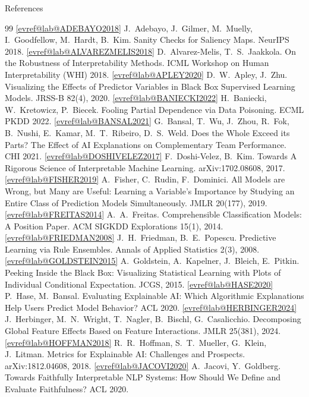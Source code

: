\documentclass[10pt,compress,t,notes=noshow,xcolor=table]{beamer}
\makeatletter
\newcommand{\citeref}[1]{%
  \href{\csname evref@url@#1\endcsname}{[\csname evref@lab@#1\endcsname]}}
\makeatother
\begin{document}
{
\begin{frame}[allowframebreaks]{References}
\tiny
\begin{thebibliography}{99}\setlength{\itemsep}{0.25em}
 \citeref{ADEBAYO2018} J.~Adebayo, J.~Gilmer, M.~Muelly, I.~Goodfellow, M.~Hardt, B.~Kim. Sanity Checks for Saliency Maps. NeurIPS 2018.
 \citeref{ALVAREZMELIS2018} D.~Alvarez-Melis, T.~S.~Jaakkola. On the Robustness of Interpretability Methods. ICML Workshop on Human Interpretability (WHI) 2018.
 \citeref{APLEY2020} D.~W.~Apley, J.~Zhu. Visualizing the Effects of Predictor Variables in Black Box Supervised Learning Models. JRSS-B 82(4), 2020.
 \citeref{BANIECKI2022} H.~Baniecki, W.~Kretowicz, P.~Biecek. Fooling Partial Dependence via Data Poisoning. ECML PKDD 2022.
 \citeref{BANSAL2021} G.~Bansal, T.~Wu, J.~Zhou, R.~Fok, B.~Nushi, E.~Kamar, M.~T.~Ribeiro, D.~S.~Weld. Does the Whole Exceed its Parts? The Effect of AI Explanations on Complementary Team Performance. CHI 2021.
 \citeref{DOSHIVELEZ2017} F.~Doshi-Velez, B.~Kim. Towards A Rigorous Science of Interpretable Machine Learning. arXiv:1702.08608, 2017.
 \citeref{FISHER2019} A.~Fisher, C.~Rudin, F.~Dominici. All Models are Wrong, but Many are Useful: Learning a Variable's Importance by Studying an Entire Class of Prediction Models Simultaneously. JMLR 20(177), 2019.
 \citeref{FREITAS2014} A.~A.~Freitas. Comprehensible Classification Models: A Position Paper. ACM SIGKDD Explorations 15(1), 2014.
 \citeref{FRIEDMAN2008} J.~H.~Friedman, B.~E.~Popescu. Predictive Learning via Rule Ensembles. Annals of Applied Statistics 2(3), 2008.
 \citeref{GOLDSTEIN2015} A.~Goldstein, A.~Kapelner, J.~Bleich, E.~Pitkin. Peeking Inside the Black Box: Visualizing Statistical Learning with Plots of Individual Conditional Expectation. JCGS, 2015.
 \citeref{HASE2020} P.~Hase, M.~Bansal. Evaluating Explainable AI: Which Algorithmic Explanations Help Users Predict Model Behavior? ACL 2020.
 \citeref{HERBINGER2024} J.~Herbinger, M.~N.~Wright, T.~Nagler, B.~Bischl, G.~Casalicchio. Decomposing Global Feature Effects Based on Feature Interactions. JMLR 25(381), 2024.
 \citeref{HOFFMAN2018} R.~R.~Hoffman, S.~T.~Mueller, G.~Klein, J.~Litman. Metrics for Explainable AI: Challenges and Prospects. arXiv:1812.04608, 2018.
 \citeref{JACOVI2020} A.~Jacovi, Y.~Goldberg. Towards Faithfully Interpretable NLP Systems: How Should We Define and Evaluate Faithfulness? ACL 2020.

\end{thebibliography}
\end{frame}}
\end{document}
